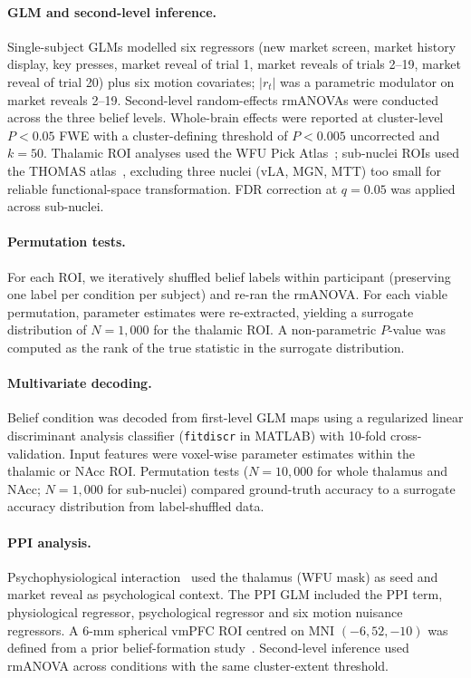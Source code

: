 \documentclass[11pt]{article}
\begin{document}
\paragraph{GLM and second-level inference.} Single-subject GLMs modelled six regressors (new market screen, market history display, key presses, market reveal of trial 1, market reveals of trials 2--19, market reveal of trial 20) plus six motion covariates; $|r_t|$ was a parametric modulator on market reveals 2--19. Second-level random-effects rmANOVAs were conducted across the three belief levels. Whole-brain effects were reported at cluster-level $P<0.05$ FWE with a cluster-defining threshold of $P<0.005$ uncorrected and $k=50$. Thalamic ROI analyses used the WFU Pick Atlas~\cite{maldjian2003automated}; sub-nuclei ROIs used the THOMAS atlas~\cite{mcleod2017spatially}, excluding three nuclei (vLA, MGN, MTT) too small for reliable functional-space transformation. FDR correction at $q=0.05$ was applied across sub-nuclei.

\paragraph{Permutation tests.} For each ROI, we iteratively shuffled belief labels within participant (preserving one label per condition per subject) and re-ran the rmANOVA. For each viable permutation, parameter estimates were re-extracted, yielding a surrogate distribution of $N=1{,}000$ for the thalamic ROI. A non-parametric $P$-value was computed as the rank of the true statistic in the surrogate distribution.

\paragraph{Multivariate decoding.} Belief condition was decoded from first-level GLM maps using a regularized linear discriminant analysis classifier (\texttt{fitdiscr} in MATLAB) with 10-fold cross-validation. Input features were voxel-wise parameter estimates within the thalamic or NAcc ROI. Permutation tests ($N=10{,}000$ for whole thalamus and NAcc; $N=1{,}000$ for sub-nuclei) compared ground-truth accuracy to a surrogate accuracy distribution from label-shuffled data.

\paragraph{PPI analysis.} Psychophysiological interaction~\cite{friston1997psychophysiological} used the thalamus (WFU mask) as seed and market reveal as psychological context. The PPI GLM included the PPI term, physiological regressor, psychological regressor and six motion nuisance regressors. A 6-mm spherical vmPFC ROI centred on MNI $(-6, 52, -10)$ was defined from a prior belief-formation study~\cite{rouault2018belief}. Second-level inference used rmANOVA across conditions with the same cluster-extent threshold.
\end{document}
